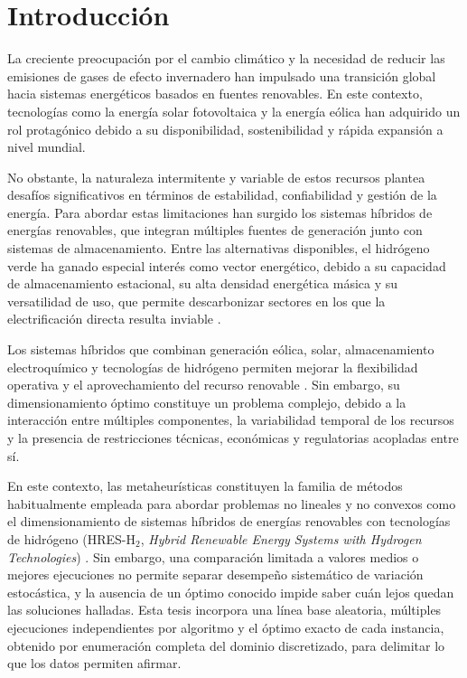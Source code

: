 \chapter{Introducción}

La creciente preocupación por el cambio climático y la necesidad de reducir las emisiones de gases de efecto invernadero han impulsado una transición global hacia sistemas energéticos basados en fuentes renovables. En este contexto, tecnologías como la energía solar fotovoltaica y la energía eólica han adquirido un rol protagónico debido a su disponibilidad, sostenibilidad y rápida expansión a nivel mundial.

No obstante, la naturaleza intermitente y variable de estos recursos plantea desafíos significativos en términos de estabilidad, confiabilidad y gestión de la energía. Para abordar estas limitaciones han surgido los sistemas híbridos de energías renovables, que integran múltiples fuentes de generación junto con sistemas de almacenamiento. Entre las alternativas disponibles, el hidrógeno verde ha ganado especial interés como vector energético, debido a su capacidad de almacenamiento estacional, su alta densidad energética másica y su versatilidad de uso, que permite descarbonizar sectores en los que la electrificación directa resulta inviable \cite{Irena2020GreenHydrogen}.

Los sistemas híbridos que combinan generación eólica, solar, almacenamiento electroquímico y tecnologías de hidrógeno permiten mejorar la flexibilidad operativa y el aprovechamiento del recurso renovable \cite{Wang2021HybridSystem,Naderipour2021HybridClean}. Sin embargo, su dimensionamiento óptimo constituye un problema complejo, debido a la interacción entre múltiples componentes, la variabilidad temporal de los recursos y la presencia de restricciones técnicas, económicas y regulatorias acopladas entre sí.

En este contexto, las metaheurísticas constituyen la familia de métodos habitualmente empleada para abordar problemas no lineales y no convexos como el dimensionamiento de sistemas híbridos de energías renovables con tecnologías de hidrógeno (HRES-H$_2$, \emph{Hybrid Renewable Energy Systems with Hydrogen Technologies}) \cite{Khan2022Review}. Sin embargo, una comparación limitada a valores medios o mejores ejecuciones no permite separar desempeño sistemático de variación estocástica, y la ausencia de un óptimo conocido impide saber cuán lejos quedan las soluciones halladas. Esta tesis incorpora una línea base aleatoria, múltiples ejecuciones independientes por algoritmo y el óptimo exacto de cada instancia, obtenido por enumeración completa del dominio discretizado, para delimitar lo que los datos permiten afirmar.

